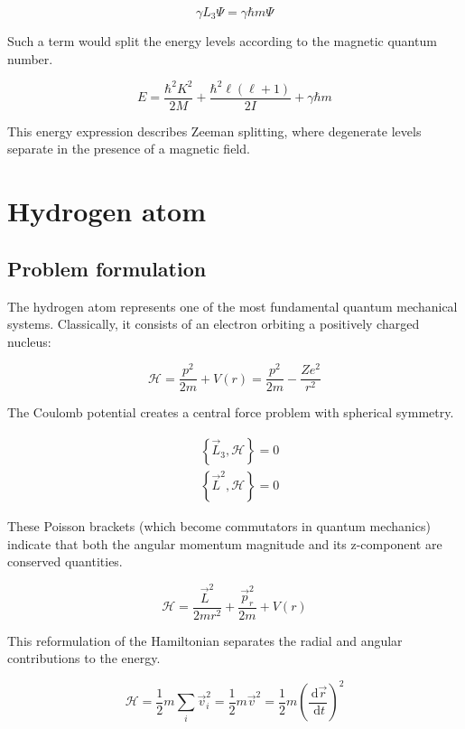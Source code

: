 \documentclass[italian]{HKNdocument}
\begin{document}
\begin{equation}
\gamma L_{3} \Psi=\gamma \hbar m \Psi
\end{equation}

Such a term would split the energy levels according to the magnetic quantum number.

\begin{equation}
E=\frac{\hbar^{2} K^{2}}{2 M}+\frac{\hbar^{2} \ell(\ell+1)}{2 I}+\gamma \hbar m
\end{equation}

This energy expression describes Zeeman splitting, where degenerate levels separate in the presence of a magnetic field.

\section{Hydrogen atom}
\subsection{Problem formulation}
The hydrogen atom represents one of the most fundamental quantum mechanical systems. Classically, it consists of an electron orbiting a positively charged nucleus:

\begin{equation}
\mathcal{H}=\frac{p^{2}}{2 m}+V(r)=\frac{p^{2}}{2 m}-\frac{Z e^{2}}{r^{2}}
\end{equation}

The Coulomb potential creates a central force problem with spherical symmetry.

\begin{align}
& \left\{\vec{L}_{3}, \mathcal{H}\right\}=0 \\
& \left\{\vec{L}^{2}, \mathcal{H}\right\}=0
\end{align}

These Poisson brackets (which become commutators in quantum mechanics) indicate that both the angular momentum magnitude and its z-component are conserved quantities.

\begin{equation}
\mathcal{H}=\frac{\vec{L}^{2}}{2 m r^{2}}+\frac{\vec{p}_{r}^{2}}{2 m}+V(r)
\end{equation}

This reformulation of the Hamiltonian separates the radial and angular contributions to the energy.

\begin{equation}
\mathcal{H}=\frac{1}{2} m \sum_{i} \vec{v}_{i}^{2}=\frac{1}{2} m \vec{v}^{2}=\frac{1}{2} m\left(\frac{\, \mathrm{d} \vec{r}}{\, \mathrm{d} t}\right)^{2}
\end{equation}
\end{document}
